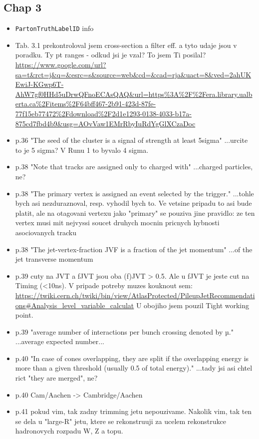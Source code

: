 \subsection{Chap 3}
\begin{itemize} 
\item \texttt{PartonTruthLabelID} info
\item Tab. 3.1 prekontroloval jsem cross-section a filter eff. a tyto udaje 
jsou v poradku. Ty pt ranges - odkud jsi je vzal? To jsem Ti posilal?
 \url{https://www.google.com/url?sa=t&rct=j&q=&esrc=s&source=web&cd=&cad=rja&uact=8&ved=2ahUKEwiJ-KGwp6T-AhW7gf0HHd5uDrwQFnoECAsQAQ&url=https%3A%2F%2Fera.library.ualberta.ca%2Fitems%2F64bff467-2b91-423d-87fe-77f15eb77472%2Fdownload%2F2d1e1293-0138-4033-b17a-875cd7fbd4b9&usg=AOvVaw1EMrRbyIuRdYgGlXCzaDoc}
\item p.36 "The seed of the cluster is a signal of strength at least 5sigma" 
...urcite to je 5 sigma? V Runu 1 to byvalo 4 sigma.
\item p.38 "Note that tracks are assigned only to charged with" ...charged 
particles, ne?
\item p.38 "The primary vertex is assigned an event selected by the 
trigger." ...tohle bych asi nezduraznoval, resp. vyhodil bych to. Ve 
vetsine pripadu to asi bude platit, ale na otagovani vertexu jako 
"primary" se pouziva jine pravidlo: ze ten vertex musi mit nejvyssi 
soucet druhych mocnin pricnych hybnosti asociovanych tracku
\item p.38 "The jet-vertex-fraction JVF is a fraction of the jet momentum" 
...of the jet transverse momentum
\item p.39 cuty na JVT a fJVT jsou oba (f)JVT > 0.5. Ale u fJVT je jeste cut 
na Timing (<10ns). V pripade potreby muzes kouknout sem: 
\url{https://twiki.cern.ch/twiki/bin/view/AtlasProtected/PileupJetRecommendations#Analysis_level_variable_calculat}
U obojiho jsem pouzil Tight working point.
\item p.39 "average number of interactions per bunch crossing denoted by µ." 
...average expected number...
\item p.40 "In case of cones overlapping, they are split if the overlapping 
energy is more than a given threshold (usually 0.5 of total energy)." 
...tady jsi asi chtel rict "they are merged", ne?
\item p.40 Cam/Aachen -> Cambridge/Aachen
\item p.41 pokud vim, tak zadny trimming jetu nepouzivame. Nakolik vim, tak 
ten se dela u "large-R" jetu, ktere se rekonstruuji za ucelem 
rekonstrukce hadronovych rozpadu W, Z a topu.
\end{itemize}

